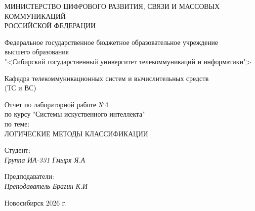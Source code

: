 \thispagestyle{empty}

\begin{center}
    МИНИСТЕРСТВО ЦИФРОВОГО РАЗВИТИЯ, СВЯЗИ И МАССОВЫХ КОММУНИКАЦИЙ \\ РОССИЙСКОЙ ФЕДЕРАЦИИ

    \vspace{20pt}

    Федеральное государственное бюджетное образовательное учреждение  \\  высшего образования \\
    "<Сибирский государственный университет телекоммуникаций и информатики"> \\

    \vspace{20pt}

    Кафедра телекоммуникационных систем и вычислительных средств \\  (ТС и ВС)
\end{center}

\vfill

\begin{center}
    Отчет по лабораторной работе №4 \\  
    по курсу "Системы искуственного интеллекта" \\
    \vspace{20pt}
    по теме: \\
    \uppercase{ЛОГИЧЕСКИЕ МЕТОДЫ
КЛАССИФИКАЦИИ}
\end{center}

\vfill

    \noindent Студент: \\
    \textit{Группа ИА-331 \hfill Гмыря Я.А} 

    \vspace{20pt}
 
    \noindent Предподаватели: \\
    \textit{Преподаватель \hfill Брагин К.И} \\
\vfill

\begin{center}
    Новосибирск 2026 г.
\end{center}